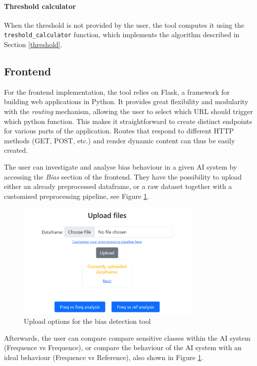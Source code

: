 \documentclass[
]{ceurart}
\begin{document}
\paragraph{Threshold calculator}
When the threshold is not provided by the user, the tool computes it using the \texttt{treshold\_calculator} function, which implements the algorithm described in Section \ref{threshold}.

\subsection{Frontend}

For the frontend implementation, the tool relies on Flask, a  framework for building web applications in Python. It provides great flexibility and modularity with the \textit{routing} mechanism, allowing the user to select which URL should trigger which python function. This makes it straightforward to create distinct endpoints for various parts of the application. Routes that respond to different HTTP methods (GET, POST, etc.) and render dynamic content can thus be easily created.

The user can investigate and analyse bias behaviour in a given AI system by accessing the \textit{Bias} section of the frontend. They have the possibility to upload either an already preprocessed dataframe, or a raw dataset together with a customised preprocessing pipeline, see Figure \ref{fig:bias_upload}.

\begin{figure}[h]
  \begin{center}
    \includegraphics[width=0.8\textwidth]{frontend_bias_upload.png}
  \end{center}
  \caption{Upload options for the bias detection tool}
  \label{fig:bias_upload}
\end{figure}


Afterwards, the user can compare compare sensitive classes within the AI system (Frequence vs Frequence), or compare the behaviour of the AI system with an ideal behaviour (Frequence vs Reference), also shown in Figure \ref{fig:bias_upload}.
\end{document}
